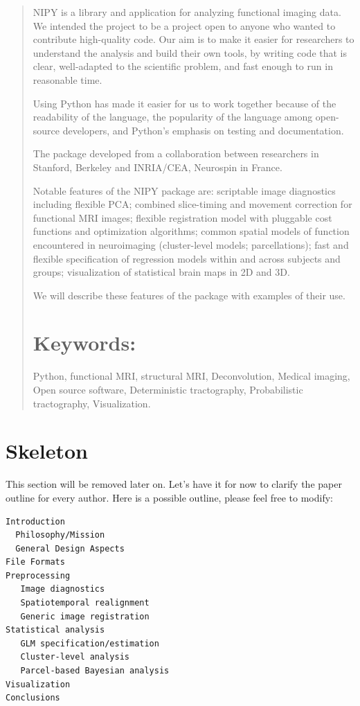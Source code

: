 \documentclass{bioinfo}
\begin{document}
\begin{abstract}
\noindent

NIPY is a library and application for analyzing functional imaging data.   We
intended the project to be a project open to anyone who wanted to contribute
high-quality code.  Our aim is to make it easier for researchers to understand
the analysis and build their own tools, by writing code that is clear,
well-adapted to the scientific problem, and fast enough to run in reasonable
time.

Using Python has made it easier for us to work together because of the
readability of the language, the popularity of the language among
open-source developers, and Python's emphasis on testing and
documentation.

The package developed from a collaboration between researchers in Stanford,
Berkeley and INRIA/CEA, Neurospin in France.

Notable features of the NIPY package are: scriptable image diagnostics
including flexible PCA; combined slice-timing and movement correction
for functional MRI images; flexible registration model with pluggable
cost functions and optimization algorithms; common spatial models of
function encountered in neuroimaging (cluster-level models;
parcellations); fast and flexible specification of regression models
within and across subjects and groups; visualization of statistical
brain maps in 2D and 3D.

We will describe these features of the package with examples of their use.

\section{Keywords:} Python, functional MRI, structural MRI, 
Deconvolution, Medical imaging, Open source software, Deterministic
tractography, Probabilistic tractography, Visualization.

\end{abstract}

\section*{Skeleton}

This section will be removed later on. Let's have it for now to
clarify the paper outline for every author. Here is a possible
outline, please feel free to modify:

\begin{verbatim}
Introduction
  Philosophy/Mission
  General Design Aspects
File Formats 
Preprocessing
   Image diagnostics
   Spatiotemporal realignment
   Generic image registration
Statistical analysis
   GLM specification/estimation
   Cluster-level analysis
   Parcel-based Bayesian analysis
Visualization
Conclusions
\end{verbatim}
\end{document}
